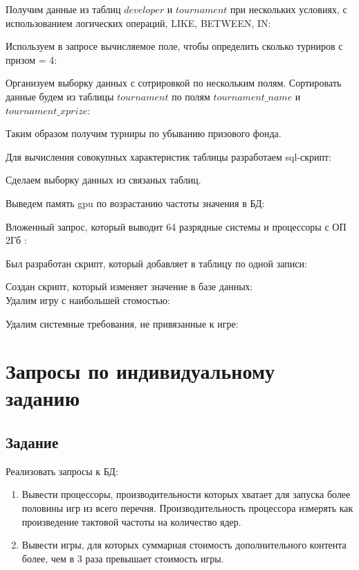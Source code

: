 \documentclass[a4paper,14pt]{extarticle}
\begin{document}
Получим данные из таблиц $developer$ и $tournament$ при нескольких условиях, с использованием логических операций, LIKE, BETWEEN, IN:


Используем в запросе вычисляемое поле, чтобы определить сколько турниров с призом = 4:


Организуем выборку данных с сотрировкой по нескольким полям.
Сортировать данные будем из таблицы $tournament$ по полям $tournament\_name$ и $tournament\_xprize$:

Таким образом получим турниры по убыванию призового фонда.

Для вычисления совокупных характеристик таблицы разработаем sql-скрипт:


Сделаем выборку данных из связаных таблиц.


Выведем память gpu по возрастанию частоты значения в БД:


Вложенный запрос, который выводит 64 разрядные системы и процессоры с ОП 2Гб :


Был разработан скрипт, который добавляет в таблицу по одной записи: 


Создан скрипт, который изменяет значение в базе данных:\\ 


Удалим игру с наибольшей стомостью:


Удалим системные требования, не привязанные к игре:


\section{Запросы по индивидуальному заданию}
\subsection{Задание}
Реализовать запросы к БД:

\begin{enumerate}
\item Вывести процессоры, производительности которых хватает для запуска более половины игр из всего перечня. Производительность процессора измерять как произведение тактовой частоты на количество ядер.
\item Вывести игры, для которых суммарная стоимость дополнительного контента более, чем в 3 раза превышает стоимость игры.
\end{enumerate}
\end{document}
